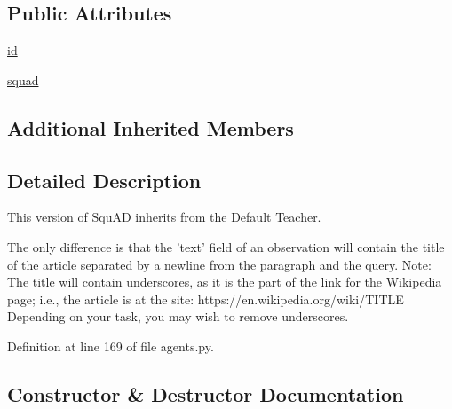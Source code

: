 \subsection*{Public Attributes}
\begin{DoxyCompactItemize}
\item 
\hyperlink{classparlai_1_1tasks_1_1squad_1_1agents_1_1TitleTeacher_afc29efc5cf9c9800f0cb5d9346b48f61}{id}
\item 
\hyperlink{classparlai_1_1tasks_1_1squad_1_1agents_1_1TitleTeacher_a416d2c1d7eb4e93ba1dc213cba6d2d26}{squad}
\end{DoxyCompactItemize}
\subsection*{Additional Inherited Members}


\subsection{Detailed Description}
\begin{DoxyVerb}This version of SquAD inherits from the Default Teacher.

The only
difference is that the 'text' field of an observation will contain
the title of the article separated by a newline from the paragraph and the
query.
Note: The title will contain underscores, as it is the part of the link for
the Wikipedia page; i.e., the article is at the site:
https://en.wikipedia.org/wiki/{TITLE}
Depending on your task, you may wish to remove underscores.
\end{DoxyVerb}
 

Definition at line 169 of file agents.\+py.



\subsection{Constructor \& Destructor Documentation}
\mbox{\label{classparlai_1_1tasks_1_1squad_1_1agents_1_1TitleTeacher_a3d00faef86db6eb5b783b4aba4216daa}} 
